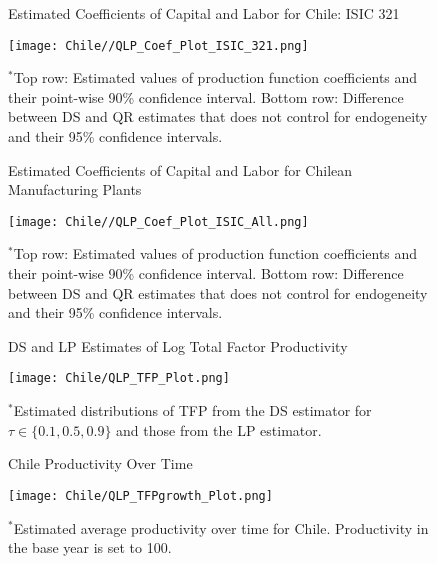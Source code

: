 \documentclass[12pt]{article}
\begin{document}
\begin{appendices}
\begin{figure}[H]
\centering
\caption{Estimated Coefficients of Capital and Labor for Chile: ISIC 321}
\texttt{[image: Chile//QLP\_Coef\_Plot\_ISIC\_321.png]}
\caption*{\footnotesize $^{*}$Top row: Estimated values of production function coefficients and their point-wise 90\% confidence interval. Bottom row: Difference between DS and QR estimates that does not control for endogeneity and their 95\% confidence intervals.}
\label{fig:QLPCHL321}
\end{figure}

\begin{figure}[H]
\centering
\caption{Estimated Coefficients of Capital and Labor for Chilean Manufacturing Plants}
\texttt{[image: Chile//QLP\_Coef\_Plot\_ISIC\_All.png]}
\caption*{\footnotesize $^{*}$Top row: Estimated values of production function coefficients and their point-wise 90\% confidence interval. Bottom row: Difference between DS and QR estimates that does not control for endogeneity and their 95\% confidence intervals.}
\label{fig:QLPCHLall}
\end{figure}

\begin{figure}[H]
\centering
\caption{DS and LP Estimates of Log Total Factor Productivity}
\texttt{[image: Chile/QLP\_TFP\_Plot.png]}
\caption*{\footnotesize $^{*}$Estimated distributions of TFP from the DS estimator for $\tau \in \{0.1, 0.5, 0.9\}$ and those from  the LP estimator.}
\label{fig:QLPCHLTFP}
\end{figure}

\begin{figure}[H]
\centering
\caption{Chile Productivity Over Time}
\texttt{[image: Chile/QLP\_TFPgrowth\_Plot.png]}
\caption*{\footnotesize $^{*}$Estimated average productivity over time for Chile. Productivity in the base year is set to 100.}
\label{fig:QLPCHLTFPG}
\end{figure}


\end{appendices}
\end{document}
